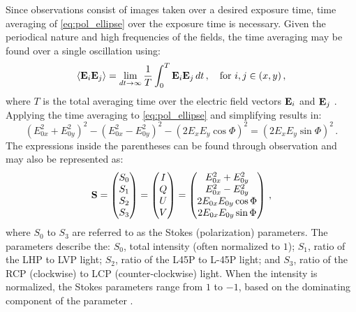 Since observations consist of images taken over a desired exposure time, time averaging of \autoref{eq:pol_ellipse} over the exposure time is necessary. Given the periodical nature and high frequencies of the fields, the time averaging may be found over a single oscillation using:
\begin{equation} \label{eq:pol_t_avg}
    \left< \mathbf{E}_{i} \mathbf{E}_{j} \right> = \lim_{dt \rightarrow \infty} \frac{1}{T} \int_{0}^{T} \mathbf{E}_{i} \mathbf{E}_{j}\,dt\,,\quad \text{for } i, j \in (x, y)\,,
\end{equation}
where $T$ is the total averaging time over the electric field vectors $\mathbf{E}_{i}$ and $\mathbf{E}_{j}$ \citep{field_guide}. Applying the time averaging to \autoref{eq:pol_ellipse} and simplifying results in:
\begin{equation} \label{eq:pol_ellipse_alt}
    (E_{0x}^{2} + E_{0y}^{2})^{2} - (E_{0x}^{2} - E_{0y}^{2})^{2} - (2 E_{x} E_{y} \cos \Phi)^{2} = (2 E_{x} E_{y} \sin \Phi)^{2}\,.
\end{equation}
The expressions inside the parentheses can be found through observation and may also be represented as:
\begin{equation} \label{eq:Stokes_params}
    \mathbf{S} =
    \begin{pmatrix}
        S_{0} \\
        S_{1} \\
        S_{2} \\
        S_{3}
    \end{pmatrix}
    =
    \begin{pmatrix}
        I \\
        Q \\
        U \\
        V
    \end{pmatrix}
    =
    \begin{pmatrix}
        E_{0x}^{2} + E_{0y}^{2}   \\
        E_{0x}^{2} - E_{0y}^{2}   \\
        2 E_{0x} E_{0y} \cos \Phi \\
        2 E_{0x} E_{0y} \sin \Phi
    \end{pmatrix}\,,
\end{equation}
where $S_{0}$ to $ S_{3}$ are referred to as the Stokes (polarization) parameters. The parameters describe the: $S_{0}$, total intensity (often normalized to $1$); $S_{1}$, ratio of the \gls{LHP} to \gls{LVP} light; $S_{2}$, ratio of the \gls{L45P} to \gls{L-45P} light; and $S_{3}$, ratio of the \gls{RCP} (clockwise) to \gls{LCP} (counter-clockwise) light. When the intensity is normalized, the Stokes parameters range from $1$ to $-1$, based on the dominating component of the parameter \citep{Stokes, chandrasekhar}.

